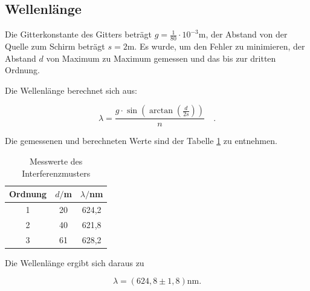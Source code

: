 \subsection{Wellenlänge}
Die Gitterkonstante des Gitters beträgt \(g=\frac{1}{80}\cdot10^{-3}\text{m}\), der Abstand von der Quelle zum Schirm beträgt \(s=2\text{m}\). Es wurde, um den Fehler zu minimieren, der Abstand \(d\) von Maximum zu Maximum gemessen und das bis zur dritten Ordnung.

\noindent Die Wellenlänge berechnet sich aus:

\begin{equation}
\lambda=\frac{g\cdot\sin{\left(\arctan{\left(\frac{d}{2s}\right)}\right)}}{n}\quad.
\end{equation}

\noindent Die gemessenen und berechneten Werte sind der Tabelle \ref{tab:t3} zu entnehmen.

\begin{table}[H]
	\begin{center}
		\begin{tabular}{c c c}
			\toprule
			Ordnung & \(d/\)m & \(\lambda/\)nm \\
			\midrule
			1 & 20 & 624,2\\
			2 & 40 & 621,8\\
			3 & 61 & 628,2\\
			\bottomrule
		\end{tabular}
		\caption{Messwerte des Interferenzmusters}
		\label{tab:t3}
	\end{center}
\end{table}

\noindent Die Wellenlänge ergibt sich daraus zu

\begin{equation*}
\lambda=(624,8\pm1,8)\text{nm}.
\end{equation*}